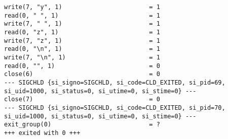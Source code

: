 \begin{verbatim}
write(7, "y", 1)                        = 1
read(0, " ", 1)                         = 1
write(7, " ", 1)                        = 1
read(0, "z", 1)                         = 1
write(7, "z", 1)                        = 1
read(0, "\n", 1)                        = 1
write(7, "\n", 1)                       = 1
read(0, "", 1)                          = 0
close(6)                                = 0
--- SIGCHLD {si_signo=SIGCHLD, si_code=CLD_EXITED, si_pid=69, si_uid=1000, si_status=0, si_utime=0, si_stime=0} ---
close(7)                                = 0
--- SIGCHLD {si_signo=SIGCHLD, si_code=CLD_EXITED, si_pid=70, si_uid=1000, si_status=0, si_utime=0, si_stime=0} ---
exit_group(0)                           = ?
+++ exited with 0 +++

\end{verbatim}

\pagebreak